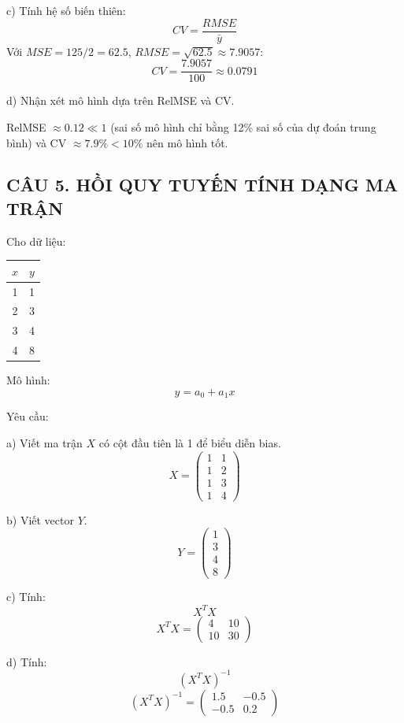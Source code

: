 \documentclass[a4paper,12pt]{article}
\begin{document}
c) Tính hệ số biến thiên:
\[ CV = \frac{RMSE}{\bar{y}} \]
Với $MSE = 125/2 = 62.5$, $RMSE = \sqrt{62.5} \approx 7.9057$:
\[ CV = \frac{7.9057}{100} \approx 0.0791 \]

d) Nhận xét mô hình dựa trên RelMSE và CV.

RelMSE $\approx 0.12 \ll 1$ (sai số mô hình chỉ bằng 12\% sai số của dự đoán trung bình)
và CV $\approx 7.9\% < 10\%$ nên mô hình tốt.

\subsection*{CÂU 5. HỒI QUY TUYẾN TÍNH DẠNG MA TRẬN}

Cho dữ liệu:
\begin{center}
\begin{tabular}{|c|c|}
\hline
$x$ & $y$ \\
\hline
1 & 1 \\
2 & 3 \\
3 & 4 \\
4 & 8 \\
\hline
\end{tabular}
\end{center}

Mô hình:
\[ y = a_0 + a_1 x \]

Yêu cầu:

a) Viết ma trận $X$ có cột đầu tiên là 1 để biểu diễn bias.
\[ X = \begin{pmatrix}
1 & 1 \\
1 & 2 \\
1 & 3 \\
1 & 4
\end{pmatrix} \]

b) Viết vector $Y$.
\[ Y = \begin{pmatrix} 1 \\ 3 \\ 4 \\ 8 \end{pmatrix} \]

c) Tính:
\[ X^T X \]
\[ X^T X = \begin{pmatrix} 4 & 10 \\ 10 & 30 \end{pmatrix} \]

d) Tính:
\[ \left(X^T X\right)^{-1} \]
\[ \left(X^T X\right)^{-1} = \begin{pmatrix} 1.5 & -0.5 \\ -0.5 & 0.2 \end{pmatrix} \]
\end{document}
